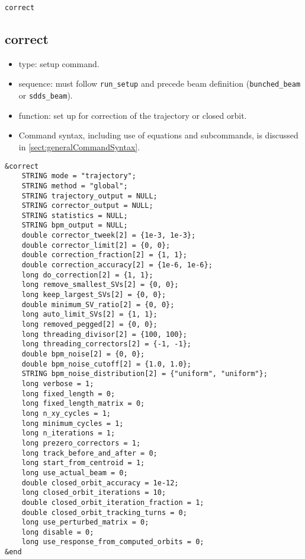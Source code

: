 \documentclass[11pt]{article}
\begin{document}
\newpage
\begin{center}{\Large\verb|correct|}\end{center}
\subsection{correct \label{subsec:correct}}

\begin{itemize}
\item type: setup command.
\item sequence: must follow \verb|run_setup| and precede beam definition (\verb|bunched_beam| or \verb|sdds_beam|).
\item function: set up for correction of the trajectory or closed orbit.
\item Command syntax, including use of equations and subcommands, is discussed in \ref{sect:generalCommandSyntax}.
\end{itemize}

\begin{verbatim}
&correct
    STRING mode = "trajectory";
    STRING method = "global";
    STRING trajectory_output = NULL;
    STRING corrector_output = NULL;
    STRING statistics = NULL;
    STRING bpm_output = NULL;
    double corrector_tweek[2] = {1e-3, 1e-3};
    double corrector_limit[2] = {0, 0};
    double correction_fraction[2] = {1, 1};
    double correction_accuracy[2] = {1e-6, 1e-6};
    long do_correction[2] = {1, 1};
    long remove_smallest_SVs[2] = {0, 0};
    long keep_largest_SVs[2] = {0, 0};
    double minimum_SV_ratio[2] = {0, 0};
    long auto_limit_SVs[2] = {1, 1};
    long removed_pegged[2] = {0, 0};
    long threading_divisor[2] = {100, 100};
    long threading_correctors[2] = {-1, -1};
    double bpm_noise[2] = {0, 0};
    double bpm_noise_cutoff[2] = {1.0, 1.0};
    STRING bpm_noise_distribution[2] = {"uniform", "uniform"};
    long verbose = 1;
    long fixed_length = 0;
    long fixed_length_matrix = 0;
    long n_xy_cycles = 1;
    long minimum_cycles = 1;
    long n_iterations = 1;
    long prezero_correctors = 1;
    long track_before_and_after = 0;
    long start_from_centroid = 1;
    long use_actual_beam = 0;
    double closed_orbit_accuracy = 1e-12;
    long closed_orbit_iterations = 10;
    double closed_orbit_iteration_fraction = 1;
    double closed_orbit_tracking_turns = 0;
    long use_perturbed_matrix = 0;
    long disable = 0;
    long use_response_from_computed_orbits = 0;
&end
\end{verbatim}
\end{document}
